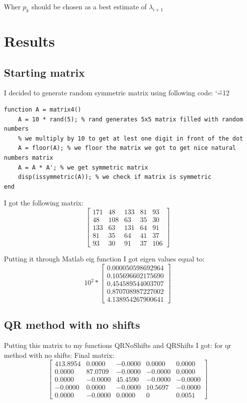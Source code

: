\documentclass[12pt]{report}
\newenvironment{simplechar}{%
   \catcode`\^=12
}{}
\begin{document}
Wher $p_k$ should be chosen as a best estimate of $\lambda_{i+1}$

\newpage
\section{Results}
\subsection{Starting matrix}
I decided to generate random symmetric matrix using following code:
\begin{simplechar}
\begin{lstlisting}
function A = matrix4()
    A = 10 * rand(5); % rand generates 5x5 matrix filled with random numbers
    % we multiply by 10 to get at lest one digit in front of the dot
    A = floor(A); % we floor the matrix we got to get nice natural numbers matrix
    A = A * A'; % we get symmetric matrix
    disp(issymmetric(A)); % we check if matrix is symmetric
end
\end{lstlisting}
\end{simplechar}
I got the following matrix:
\[
\begin{bmatrix}
171  &  48  & 133  &  81  &  93 \\
 48  & 108  &  63  &  35  &  30 \\
133  &  63  & 131  &  64  &  91 \\
 81  &  35  &  64  &  41  &  37 \\
 93  &  30  &  91  &  37  & 106
\end{bmatrix}
\]

Putting it through Matlab eig function I got eigen values equal to:
\[
10^{2} *
\begin{bmatrix}
  0.000050598692964 \\
  0.105696602175690 \\
  0.454589544003707 \\
  0.870708987227002 \\
  4.138954267900641
\end{bmatrix}
\]

\newpage
\subsection{QR method with no shifts}
Putting this matrix to my functions QRNoShifts and QRShifts I got:
for qr method with no shifts:
Final matrix:
\[
\begin{bmatrix}
413.8954  &  0.0000  & -0.0000  &  0.0000  &  0.0000 \\
 0.0000  & 87.0709  &  -0.0000  &  -0.0000  &  0.0000 \\
0.0000  &  -0.0000  & 45.4590  &  -0.0000  &  -0.0000 \\
 -0.0000  &  0.0000  &  -0.0000  &  10.5697  &  -0.0000 \\
 0.0000  &  -0.0000  &  0.0000  &  0  & 0.0051
\end{bmatrix}
\]
\end{document}
